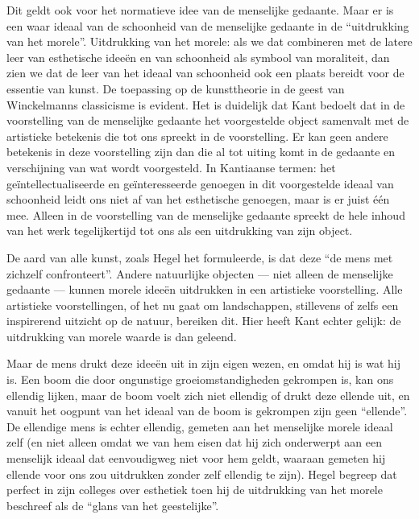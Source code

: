 Dit geldt ook voor het normatieve idee van de menselijke gedaante. Maar er is een waar ideaal van de schoonheid van de menselijke gedaante in de ``uitdrukking van het morele''. Uitdrukking van het morele: als we dat combineren met de latere leer van esthetische ideeën en van schoonheid als symbool van moraliteit, dan zien we dat de leer van het ideaal van schoonheid ook een plaats bereidt voor de essentie van kunst. De toepassing op de kunsttheorie in de geest van Winckelmanns classicisme is evident. Het is duidelijk dat Kant bedoelt dat in de voorstelling van de menselijke gedaante het voorgestelde object samenvalt met de artistieke betekenis die tot ons spreekt in de voorstelling. Er kan geen andere betekenis in deze voorstelling zijn dan die al tot uiting komt in de gedaante en verschijning van wat wordt voorgesteld. In Kantiaanse termen: het geïntellectualiseerde en geïnteresseerde genoegen in dit voorgestelde ideaal van schoonheid leidt ons niet af van het esthetische genoegen, maar is er juist één mee. Alleen in de voorstelling van de menselijke gedaante spreekt de hele inhoud van het werk tegelijkertijd tot ons als een uitdrukking van zijn object.

De aard van alle kunst, zoals Hegel het formuleerde, is dat deze ``de mens met zichzelf confronteert''. Andere natuurlijke objecten — niet alleen de menselijke gedaante — kunnen morele ideeën uitdrukken in een artistieke voorstelling. Alle artistieke voorstellingen, of het nu gaat om landschappen, stillevens of zelfs een inspirerend uitzicht op de natuur, bereiken dit. Hier heeft Kant echter gelijk: de uitdrukking van morele waarde is dan geleend.

Maar de mens drukt deze ideeën uit in zijn eigen wezen, en omdat hij is wat hij is. Een boom die door ongunstige groeiomstandigheden gekrompen is, kan ons ellendig lijken, maar de boom voelt zich niet ellendig of drukt deze ellende uit, en vanuit het oogpunt van het ideaal van de boom is gekrompen zijn geen ``ellende''. De ellendige mens is echter ellendig, gemeten aan het menselijke morele ideaal zelf (en niet alleen omdat we van hem eisen dat hij zich onderwerpt aan een menselijk ideaal dat eenvoudigweg niet voor hem geldt, waaraan gemeten hij ellende voor ons zou uitdrukken zonder zelf ellendig te zijn). Hegel begreep dat perfect in zijn colleges over esthetiek toen hij de uitdrukking van het morele beschreef als de ``glans van het geestelijke''.

